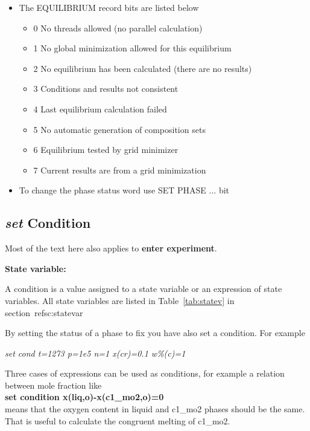 \documentclass[11pt]{article}
\begin{document}
\begin{itemize}
\item The EQUILIBRIUM record bits are listed below
  \begin{itemize}
  \item   0  No threads allowed (no parallel calculation)
  \item   1  No global minimization allowed for this equilibrium
  \item   2  No equilibrium has been calculated (there are no results)
  \item   3  Conditions and results not consistent
  \item   4  Last equilibrium calculation failed
  \item   5  No automatic generation of composition sets
  \item   6  Equilibrium tested by grid minimizer
  \item   7  Current results are from a grid minimization
  \end{itemize}
\item To change the phase status word use SET PHASE ... bit
\end{itemize}
\hypertarget{Info conditions}{}
\hypertarget{Set condition}{}
\subsection{{\em set} Condition}\label{sc:setcond}

Most of the text here also applies to {\bf enter experiment}.

{\bf State variable:}

A condition is a value assigned to a state variable or an expression
of state variables.  All state variables are listed in
Table~\ref{tab:statev} in section~ref{sc:statevar}

By setting the status of a phase to fix you have
also set a condition.  For example

{\em set cond t=1273 p=1e5 n=1 x(cr)=0.1 w\%(c)=1}

Three cases of expressions can be used as conditions, for example a
relation between mole fraction like\\
{\bf set condition x(liq,o)-x(c1\_mo2,o)=0}\\
means that the oxygen content in liquid and c1\_mo2 phases should be the
same.  That is useful to calculate the congruent melting of c1\_mo2.
\end{document}
